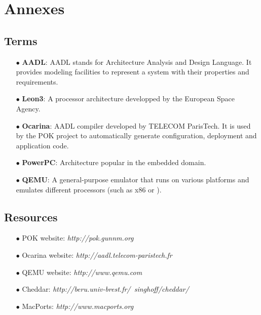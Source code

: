 %
% 
%
%
%
%
%


\chapter{Annexes}

   \section{Terms}
   \begin{itemize}
      \item[$\bullet$] \textbf{AADL}: AADL stands for Architecture Analysis and
         Design Language. It provides modeling facilities to represent a system
         with their properties and requirements.

      \item[$\bullet$] \textbf{Leon3}: A processor architecture developped by
         the European Space Agency.

      \item[$\bullet$] \textbf{Ocarina}:
         AADL compiler developed by TELECOM ParisTech. It is used by the POK
         project to automatically generate configuration, deployment and
         application code.

      \item[$\bullet$] \textbf{PowerPC}:
         Architecture popular in the embedded domain.

      \item[$\bullet$] \textbf{QEMU}:
         A general-purpose emulator that runs on various platforms and emulates
         different processors (such as \intel x86 or \powerpc).
   \end{itemize}


   \section{Resources}
   \label{annex-url}
   \begin{itemize}
      \item[$\bullet$] POK website: \textit{http://pok.gunnm.org}
      \item[$\bullet$] Ocarina website: \textit{http://aadl.telecom-paristech.fr}
      \item[$\bullet$] QEMU website: \textit{http://www.qemu.com}
      \item[$\bullet$] Cheddar:
      \textit{http://beru.univ-brest.fr/~singhoff/cheddar/}
      \item[$\bullet$] MacPorts: \textit{http://www.macports.org}
   \end{itemize}


